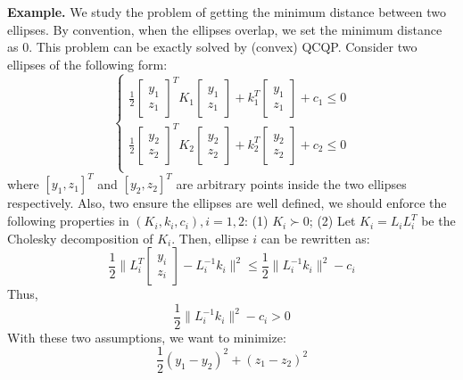 \documentclass[
]{book}
\theoremstyle{definition}
\theoremstyle{definition}
\theoremstyle{definition}
\theoremstyle{definition}
\theoremstyle{remark}
\begin{document}
\textbf{Example.} We study the problem of getting the minimum distance between two ellipses. By convention, when the ellipses overlap, we set the minimum distance as \(0\). This problem can be exactly solved by (convex) QCQP.
Consider two ellipses of the following form:
\begin{equation*}
   \begin{cases}
      \frac{1}{2} \begin{bmatrix} y_1 \\ z_1 \end{bmatrix}^T K_1 \begin{bmatrix} y_1 \\ z_1 \end{bmatrix}
      + k_1^T \begin{bmatrix} y_1 \\ z_1 \end{bmatrix} + c_1 \le 0 \\ 
      \frac{1}{2} \begin{bmatrix} y_2 \\ z_2 \end{bmatrix}^T K_2 \begin{bmatrix} y_2 \\ z_2 \end{bmatrix}
      + k_2^T \begin{bmatrix} y_2 \\ z_2 \end{bmatrix} + c_2 \le 0 \\ 
   \end{cases}
\end{equation*}
where \([y_1, z_1]^T\) and \([y_2, z_2]^T\) are arbitrary points inside the two ellipses respectively. Also, two ensure the ellipses are well defined, we should enforce the following properties in \((K_i, k_i, c_i), i = 1, 2\): (1) \(K_i \succ 0\); (2) Let \(K_i = L_i L_i^T\) be the Cholesky decomposition of \(K_i\). Then, ellipse \(i\) can be rewritten as:
\begin{equation*}
   \frac{1}{2} \parallel L_i^T \begin{bmatrix} y_i \\ z_i \end{bmatrix} - L_i^{-1} k_i \parallel^2 \le 
   \frac{1}{2} \parallel L_i^{-1} k_i \parallel^2 - c_i
\end{equation*}
Thus,
\begin{equation*}
   \frac{1}{2} \parallel L_i^{-1} k_i \parallel^2 - c_i > 0
\end{equation*}
With these two assumptions, we want to minimize:
\begin{equation*}
   \frac{1}{2} (y_1 - y_2)^2 + (z_1 - z_2)^2
\end{equation*}
\end{document}

